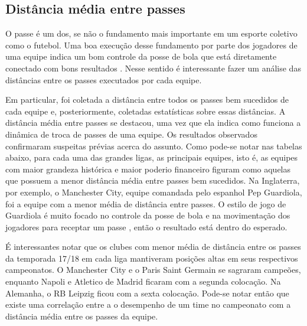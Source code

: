 \documentclass{article}
\begin{document}
\subsection{Distância média entre passes}

O passe é um dos, se não o fundamento mais importante em um esporte coletivo
como o futebol. Uma boa execução desse fundamento por parte dos jogadores
de uma equipe indica um bom controle da posse de bola que está diretamente
conectado com bons resultados \cite{cox2022linhas}. Nesse sentido é
interessante fazer um análise
das distâncias entre os passes
executados por cada equipe.

Em particular, foi coletada a distância entre todos os passes bem sucedidos de
cada equipe e, posteriormente, coletadas estatísticas sobre essas distâncias. A
distância média
entre passes se destacou, uma vez que ela indica como funciona a dinâmica de
troca de passes de uma equipe. Os resultados observados confirmaram suspeitas
prévias acerca do assunto.
Como pode-se notar nas tabelas abaixo, para cada uma das grandes ligas, as
principais equipes, isto é, as equipes com maior grandeza histórica e maior
poderio financeiro figuram como aquelas
que possuem a menor distância média entre passes bem sucedidos. Na Inglaterra,
por exemplo, o Manchester City, equipe comandada pelo espanhol Pep Guardiola,
foi a equipe com a menor média
de distância entre passes. O estilo de jogo de Guardiola é muito focado no
controle da posse de bola e na movimentação dos jogadores para receptar um
passe \cite{terzis2023pep}, então o resultado está dentro do
esperado.

É interessantes notar que os clubes com menor média de distância entre os
passes da temporada 17/18 em cada liga mantiveram posições altas em seus
respectivos campeonatos. O Manchester City e o Paris Saint Germain se sagraram
campeões, enquanto Napoli e Atletico de Madrid ficaram com a segunda colocação.
Na Alemanha, o RB Leipzig ficou com a sexta colocação. Pode-se notar então que
existe uma correlação entre a o desempenho de um time no campeonato com a
distância média entre os passes da equipe.
\end{document}
